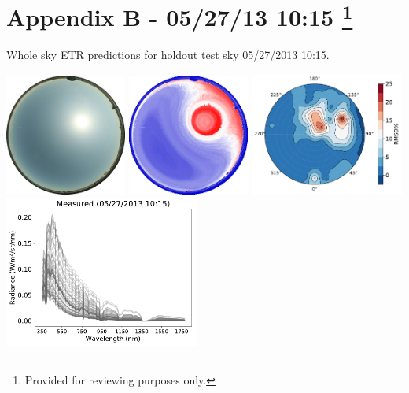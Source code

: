 \section*{Appendix B - 05/27/13 10:15 \footnote{Provided for reviewing purposes only.}}

\noindent
Whole sky ETR predictions for holdout test sky {05/27/2013 10:15}.%

\begin{center}
\includegraphics[width=0.30\textwidth]{img/05271015.jpg}
\includegraphics[width=0.30\textwidth]{img/05271015_sradmap.png}
\includegraphics[width=0.38\textwidth]{img/05271015_wholesky_full.pdf}\\
\vspace{0.26in}%
\includegraphics[width=0.48\textwidth]{img/05271015_measured.pdf}

\end{center}
